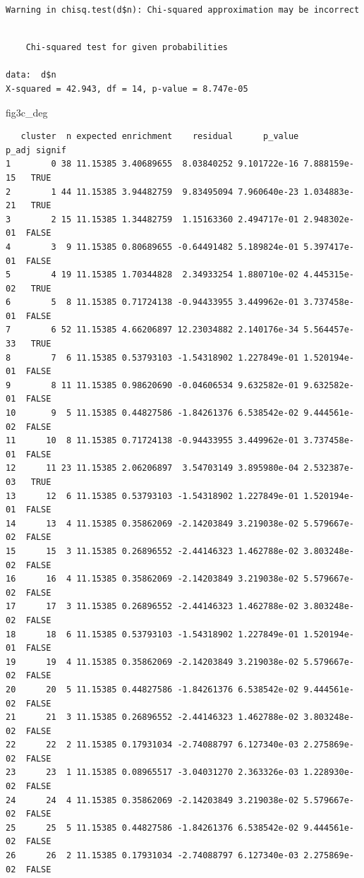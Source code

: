 \documentclass[
  landscape]{article}
\newenvironment{Shaded}{\begin{snugshade}}{\end{snugshade}}
\newcommand{\NormalTok}[1]{#1}
\begin{document}
\begin{verbatim}
Warning in chisq.test(d$n): Chi-squared approximation may be incorrect
\end{verbatim}

\begin{verbatim}

    Chi-squared test for given probabilities

data:  d$n
X-squared = 42.943, df = 14, p-value = 8.747e-05
\end{verbatim}

\begin{Shaded}
\begin{Highlighting}[]
\NormalTok{fig3c\_deg}
\end{Highlighting}
\end{Shaded}

\begin{verbatim}
   cluster  n expected enrichment    residual      p_value        p_adj signif
1        0 38 11.15385 3.40689655  8.03840252 9.101722e-16 7.888159e-15   TRUE
2        1 44 11.15385 3.94482759  9.83495094 7.960640e-23 1.034883e-21   TRUE
3        2 15 11.15385 1.34482759  1.15163360 2.494717e-01 2.948302e-01  FALSE
4        3  9 11.15385 0.80689655 -0.64491482 5.189824e-01 5.397417e-01  FALSE
5        4 19 11.15385 1.70344828  2.34933254 1.880710e-02 4.445315e-02   TRUE
6        5  8 11.15385 0.71724138 -0.94433955 3.449962e-01 3.737458e-01  FALSE
7        6 52 11.15385 4.66206897 12.23034882 2.140176e-34 5.564457e-33   TRUE
8        7  6 11.15385 0.53793103 -1.54318902 1.227849e-01 1.520194e-01  FALSE
9        8 11 11.15385 0.98620690 -0.04606534 9.632582e-01 9.632582e-01  FALSE
10       9  5 11.15385 0.44827586 -1.84261376 6.538542e-02 9.444561e-02  FALSE
11      10  8 11.15385 0.71724138 -0.94433955 3.449962e-01 3.737458e-01  FALSE
12      11 23 11.15385 2.06206897  3.54703149 3.895980e-04 2.532387e-03   TRUE
13      12  6 11.15385 0.53793103 -1.54318902 1.227849e-01 1.520194e-01  FALSE
14      13  4 11.15385 0.35862069 -2.14203849 3.219038e-02 5.579667e-02  FALSE
15      15  3 11.15385 0.26896552 -2.44146323 1.462788e-02 3.803248e-02  FALSE
16      16  4 11.15385 0.35862069 -2.14203849 3.219038e-02 5.579667e-02  FALSE
17      17  3 11.15385 0.26896552 -2.44146323 1.462788e-02 3.803248e-02  FALSE
18      18  6 11.15385 0.53793103 -1.54318902 1.227849e-01 1.520194e-01  FALSE
19      19  4 11.15385 0.35862069 -2.14203849 3.219038e-02 5.579667e-02  FALSE
20      20  5 11.15385 0.44827586 -1.84261376 6.538542e-02 9.444561e-02  FALSE
21      21  3 11.15385 0.26896552 -2.44146323 1.462788e-02 3.803248e-02  FALSE
22      22  2 11.15385 0.17931034 -2.74088797 6.127340e-03 2.275869e-02  FALSE
23      23  1 11.15385 0.08965517 -3.04031270 2.363326e-03 1.228930e-02  FALSE
24      24  4 11.15385 0.35862069 -2.14203849 3.219038e-02 5.579667e-02  FALSE
25      25  5 11.15385 0.44827586 -1.84261376 6.538542e-02 9.444561e-02  FALSE
26      26  2 11.15385 0.17931034 -2.74088797 6.127340e-03 2.275869e-02  FALSE
\end{verbatim}
\end{document}
